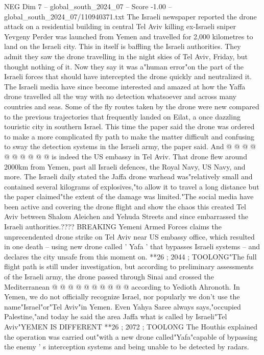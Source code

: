\begin{textsample}{NEG Dim 7 – global\_south\_2024\_07 – Score -1.00 – global\_south\_2024\_07/110940371.txt}  \label{ex:f7_neg_352}
The Israeli newspaper reported the drone attack on a residential building in central Tel Aviv killing ex-Israeli sniper Yevgeny Perder was launched from Yemen and travelled for 2,000 kilometres to land on the Israeli city.
This in itself is baffling the Israeli authorities.
They admit they saw the drone travelling in the night skies of Tel Aviv, Friday, but thought nothing of it.
Now they say it was a"human error"on the part of the Israeli forces that should have intercepted the drone quickly and neutralized it.
The Israeli media have since become interested and amazed at how the Yaffa drone travelled all the way with no detection whatsoever and across many countries and seas.
Some of the fly routes taken by the drone were new compared to the previous trajectories that frequently landed on Eilat, a once dazzling touristic city in southern Israel.
This time the paper said the drone was ordered to make a more complicated fly path to make the matter difficult and confusing to sway the detection systems in the Israeli army, the paper said.
And @ @ @ @ @ @ @ @ @ @ is indeed the US embassy in Tel Aviv.
That drone flew around 2000km from Yemen, past all Israeli defences, the Royal Navy, US Navy, and more.
The Israeli daily stated the Jaffa drone warhead was"relatively small and contained several kilograms of explosives,"to allow it to travel a long distance but the paper claimed"the extent of the damage was limited."The social media have been active and covering the drone flight and show the chaos this created Tel Aviv between Shalom Aleichen and Yehuda Streets and since embarrassed the Israeli authorities.????
BREAKING Yemeni Armed Forces claims the unprecendented drone strike on Tel Aviv near US embassy office, which resulted in one death -- using new drone called ' Yafa ' that bypasses Israeli systems -- and declares the city unsafe from this moment on. **26 ; 2044 ; TOOLONG"The full flight path is still under investigation, but according to preliminary assessments of the Israeli army, the drone passed through Sinai and crossed the Mediterranean @ @ @ @ @ @ @ @ @ @ according to Yedioth Ahronoth.
In Yemen, we do not officially recognize Israel, nor popularly we don't use the name"Israel"or"Tel Aviv"in Yemen.
Even Yahya Saree always says,"occupied Palestine,"and today he said the area Jaffa what is called by Israeli"Tel Aviv"YEMEN IS DIFFERENT **26 ; 2072 ; TOOLONG The Houthis explained the operation was carried out"with a new drone called"Yafa"capable of bypassing the enemy ' s interception systems and being unable to be detected by radars.

\end{textsample}
